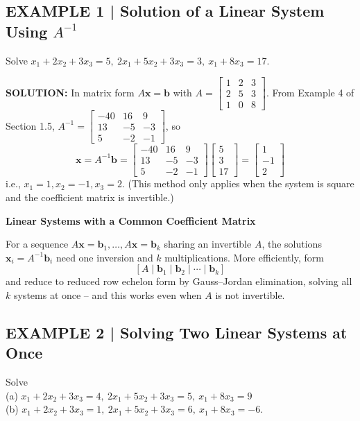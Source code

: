 \documentclass{article}
\newcommand{\redheading}[1]{{\vspace{2mm}\noindent\Large\bfseries\color{red!55!black} #1\par}\vspace{2mm}}
\theoremstyle{mystyle}
\begin{document}
\subsection*{EXAMPLE 1 | Solution of a Linear System Using $A^{-1}$}
Solve $x_1+2x_2+3x_3=5,\ 2x_1+5x_2+3x_3=3,\ x_1+8x_3=17$.

\textbf{SOLUTION:} In matrix form $A\mathbf{x}=\mathbf{b}$ with $A=\begin{bmatrix}1&2&3\\2&5&3\\1&0&8\end{bmatrix}$. From Example 4 of Section 1.5, $A^{-1}=\begin{bmatrix}-40&16&9\\13&-5&-3\\5&-2&-1\end{bmatrix}$, so
\[
\mathbf{x}=A^{-1}\mathbf{b}=\begin{bmatrix}-40&16&9\\13&-5&-3\\5&-2&-1\end{bmatrix}\begin{bmatrix}5\\3\\17\end{bmatrix}=\begin{bmatrix}1\\-1\\2\end{bmatrix}
\]
i.e., $x_1=1,x_2=-1,x_3=2$. (This method only applies when the system is square and the coefficient matrix is invertible.)

\redheading{Linear Systems with a Common Coefficient Matrix}

For a sequence $A\mathbf{x}=\mathbf{b}_1,\dots,A\mathbf{x}=\mathbf{b}_k$ sharing an invertible $A$, the solutions $\mathbf{x}_i=A^{-1}\mathbf{b}_i$ need one inversion and $k$ multiplications. More efficiently, form
\[
[A\mid\mathbf{b}_1\mid\mathbf{b}_2\mid\cdots\mid\mathbf{b}_k] \tag{1}
\]
and reduce to reduced row echelon form by Gauss--Jordan elimination, solving all $k$ systems at once -- and this works even when $A$ is not invertible.

\subsection*{EXAMPLE 2 | Solving Two Linear Systems at Once}
Solve\\ (a) $x_1+2x_2+3x_3=4,\ 2x_1+5x_2+3x_3=5,\ x_1+8x_3=9$ \\ (b) $x_1+2x_2+3x_3=1,\ 2x_1+5x_2+3x_3=6,\ x_1+8x_3=-6$.
\end{document}
